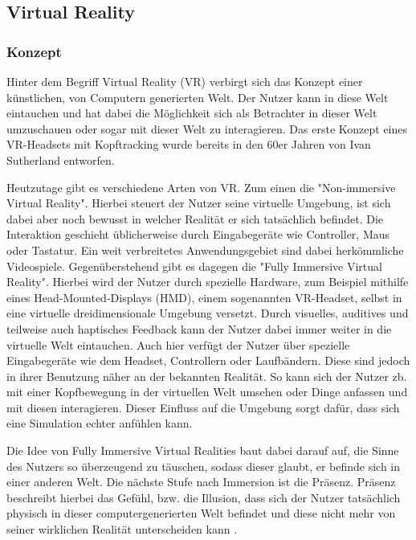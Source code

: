 \subsection{Virtual Reality}
\subsubsection{Konzept}

Hinter dem Begriff Virtual Reality (VR) verbirgt sich das Konzept einer
künstlichen, von Computern generierten Welt.
Der Nutzer kann in diese Welt eintauchen und hat dabei die Möglichkeit sich als Betrachter in dieser Welt
umzuschauen oder sogar mit dieser Welt zu interagieren. Das erste Konzept eines VR-Headsets mit Kopftracking
wurde bereits in den 60er Jahren von Ivan Sutherland entworfen. \parencite{Sutherland1965, Sutherland1968}

Heutzutage gibt es verschiedene Arten von VR. Zum einen die "Non-immersive Virtual Reality".
Hierbei steuert der Nutzer seine virtuelle Umgebung, ist sich dabei aber noch bewusst
in welcher Realität er sich tatsächlich befindet. Die Interaktion geschieht üblicherweise durch
Eingabegeräte wie Controller, Maus oder Tastatur. Ein weit verbreitetes Anwendungsgebiet sind
dabei herkömmliche Videospiele. Gegenüberstehend gibt es dagegen die "Fully Immersive Virtual Reality".
Hierbei wird der Nutzer durch spezielle Hardware, zum Beispiel mithilfe eines Head-Mounted-Displays (HMD),
einem sogenannten VR-Headset, selbst in eine virtuelle dreidimensionale Umgebung versetzt.
Durch visuelles, auditives und teilweise auch haptisches Feedback kann der Nutzer dabei immer weiter
in die virtuelle Welt eintauchen.
Auch hier verfügt der Nutzer über spezielle Eingabegeräte wie dem Headset, Controllern oder Laufbändern. Diese sind
jedoch in ihrer Benutzung näher an der bekannten Realität. So kann sich der Nutzer zb. mit einer Kopfbewegung
in der virtuellen Welt umsehen oder Dinge anfassen und mit diesen interagieren. Dieser Einfluss auf die
Umgebung sorgt dafür, dass sich eine Simulation echter anfühlen kann.

Die Idee von Fully Immersive Virtual Realities baut dabei darauf auf, die Sinne des Nutzers so überzeugend zu täuschen,
sodass dieser glaubt, er befinde sich in einer anderen Welt. Die nächste Stufe nach Immersion ist die
Präsenz. Präsenz beschreibt hierbei das Gefühl, bzw. die Illusion, dass sich der Nutzer tatsächlich
physisch in dieser computergenerierten Welt befindet und diese nicht mehr von seiner wirklichen Realität unterscheiden kann
\parencite{Schuemie2001}.




